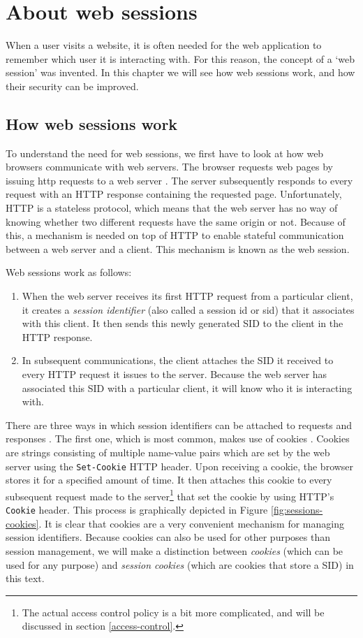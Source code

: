 \chapter{About web sessions}

When a user visits a website, it is often needed for the web application to remember which user it is interacting with. For this reason, the concept of a `web session' was invented. In this chapter we will see how web sessions work, and how their security can be improved.

\section{How web sessions work}

To understand the need for web sessions, we first have to look at how web browsers communicate with web servers. The browser requests web pages by issuing \gls{http} requests to a web server \cite{Kurose2008}. The server subsequently responds to every request with an HTTP response containing the requested page. Unfortunately, HTTP is a stateless protocol, which means that the web server has no way of knowing whether two different requests have the same origin or not. Because of this, a mechanism is needed on top of HTTP to enable stateful communication between a web server and a client. This mechanism is known as the web session.

Web sessions work as follows:
\begin{enumerate}
	\item When the web server receives its first HTTP request from a particular client, it creates a \emph{session identifier} (also called a \gls{session id} or \gls{sid}) that it associates with this client. It then sends this newly generated SID to the client in the HTTP response.
	\item In subsequent communications, the client attaches the SID it received to every HTTP request it issues to the server. Because the web server has associated this SID with a particular client, it will know who it is interacting with.
\end{enumerate}

There are three ways in which session identifiers can be attached to requests and responses \cite{Jovanovic2006}. The first one, which is most common, makes use of \glspl{cookie} \cite{Kristol2001, Park2000}. Cookies are strings consisting of multiple name-value pairs which are set by the web server using the \texttt{Set-Cookie} HTTP header. Upon receiving a cookie, the browser stores it for a specified amount of time. It then attaches this cookie to every subsequent request made to the server\footnote{The actual access control policy is a bit more complicated, and will be discussed in section \ref{access-control}.} that set the cookie by using HTTP's \texttt{Cookie} header. This process is graphically depicted in Figure \ref{fig:sessions-cookies}. It is clear that cookies are a very convenient mechanism for managing session identifiers. Because cookies can also be used for other purposes than session management, we will make a distinction between \emph{cookies} (which can be used for any purpose) and \emph{\glspl{session cookie}} (which are cookies that store a SID) in this text.

